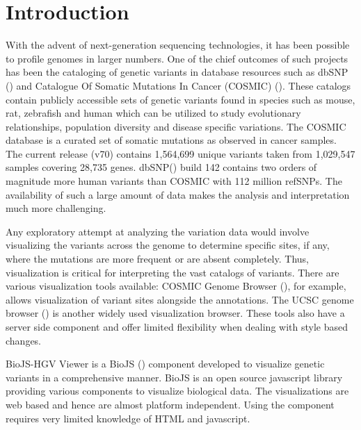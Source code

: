 \documentclass{bioinfo}
\begin{document}
\section{Introduction}

With the advent of next-generation sequencing technologies, it has been possible to profile genomes in larger numbers. One of the chief outcomes of such projects has been the cataloging of genetic variants in database resources such as dbSNP (\cite{Smigielski2000}) and Catalogue Of Somatic Mutations In Cancer (COSMIC) (\cite{Forbes2011}). These catalogs contain publicly accessible sets of genetic variants found in species such as mouse, rat, zebrafish and human which can be utilized to study evolutionary relationships, population diversity and disease specific variations. The COSMIC database is a curated set of somatic mutations as observed in cancer samples.  The current release (v70) contains 1,564,699 unique variants taken from 1,029,547 samples covering 28,735 genes. dbSNP(\cite{sherry2001dbsnp}) build 142 contains two orders of magnitude more human variants than COSMIC with 112 million refSNPs. The availability of such a large amount of data makes the analysis and interpretation much more challenging.

Any exploratory attempt at analyzing the variation data would involve visualizing the variants across the genome to determine specific sites, if any, where the mutations are more frequent or are absent completely. Thus, visualization is critical for interpreting the vast catalogs of variants. There are various visualization tools available: COSMIC Genome Browser (\cite{Forbes2011}), for example, allows visualization of variant sites alongside the annotations. The UCSC genome browser (\cite{karolchik2003ucsc}) is another widely used visualization browser. These tools also have a server side component and offer limited flexibility when dealing with style based changes.


BioJS-HGV Viewer is a BioJS (\cite{gomez2013biojs}) component developed to visualize genetic variants in a comprehensive manner. BioJS is an open source javascript library providing various components to visualize biological data. The visualizations are web based and hence are almost platform independent. 
Using the component requires very limited knowledge of HTML and javascript.



\end{document}
